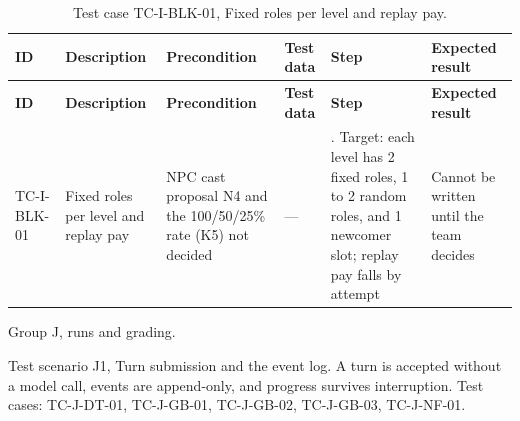 {\footnotesize{}\renewcommand{\arraystretch}{1.1}
\begin{longtable}{|>{\raggedright\arraybackslash}p{}|>{\raggedright\arraybackslash}p{}|>{\raggedright\arraybackslash}p{}|>{\raggedright\arraybackslash}p{}|>{\raggedright\arraybackslash}p{}|>{\raggedright\arraybackslash}p{}|}
\caption{Test case TC-\allowbreak{}I-\allowbreak{}BLK-\allowbreak{}01, Fixed roles per level and replay pay.} \\
\hline
\textbf{ID} & \textbf{Description} & \textbf{Precondition} & \textbf{Test data} & \textbf{Step} & \textbf{Expected result} \\ \hline
\endfirsthead
\hline
\textbf{ID} & \textbf{Description} & \textbf{Precondition} & \textbf{Test data} & \textbf{Step} & \textbf{Expected result} \\ \hline
\endhead
TC-I-BLK-01 & Fixed roles per level and replay pay & NPC cast proposal N4 and the 100/50/25\% rate (K5) not decided & --- & 1. Target: each level has 2 fixed roles, 1 to 2 random roles, and 1 newcomer slot; replay pay falls by attempt & Cannot be written until the team decides \\ \hline
\end{longtable}
}

Group J, runs and grading.

Test scenario J1, Turn submission and the event log. A turn is accepted without a model call, events are append-\allowbreak{}only, and progress survives interruption. Test cases: TC-J-DT-01, TC-J-GB-01, TC-J-GB-02, TC-J-GB-03, TC-J-NF-01.

